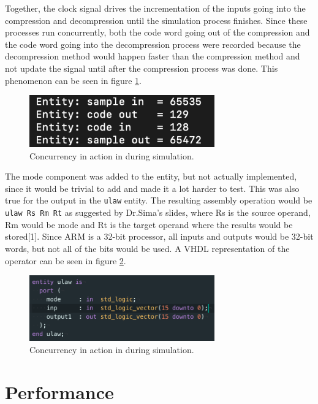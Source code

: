 \documentclass[12pt]{article}
\begin{document}
Together, the clock signal drives the incrementation of the inputs going into the compression and decompression until the simulation process finishes. Since these processes run concurrently, both the code word going out of the compression and the code word going into the decompression process were recorded because the decompression method would happen faster than the compression method and not update the signal until after the compression process was done. This phenomenon can be seen in figure \ref{fig:concur}.\\

\begin{figure}[!h]
		\centering
        \includegraphics[width=8cm]
        {concur.png}
        \caption{\label{fig:concur} Concurrency in action in during simulation.}
\end{figure}

The mode component was added to the entity, but not actually implemented, since it would be trivial to add and made it a lot harder to test. This was also true for the output in the \texttt{ulaw} entity. The resulting assembly operation would be \texttt{ulaw Rs Rm Rt} as suggested by Dr.Sima's slides, where Rs is the source operand, Rm would be mode and Rt is the target operand where the results would be stored[1]. Since ARM is a 32-bit processor, all inputs and outputs would be 32-bit words, but not all of the bits would be used. A VHDL representation of the operator can be seen in figure \ref{fig:ulaw_entity}.\\


\begin{figure}[!h]
		\centering
        \includegraphics[width=8cm]
        {ulaw_entity.png}
        \caption{\label{fig:ulaw_entity} Concurrency in action in during simulation.}
\end{figure}

\section{Performance}
\end{document}
